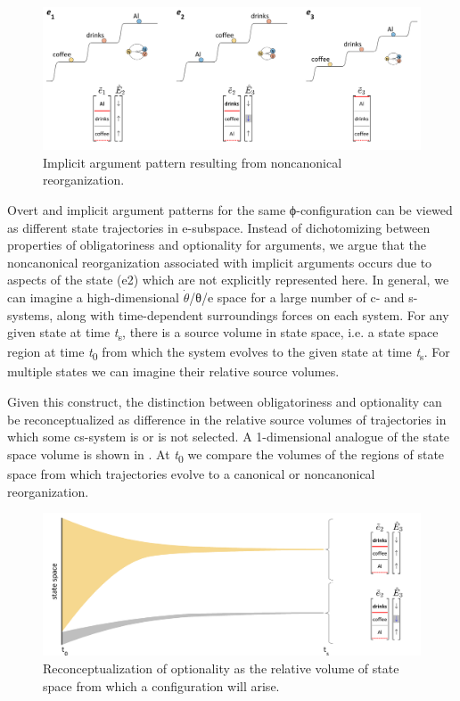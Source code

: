   
\begin{figure}
\includegraphics[width=\textwidth]{figures/Tilsen-img87.png}
\caption{Implicit argument pattern resulting from noncanonical reorganization.}
\label{fig:4:37}
\end{figure}
 

  Overt and implicit argument patterns for the same ϕ-configuration can be viewed as different state trajectories in e-subspace. Instead of dichotomizing between properties of obligatoriness and optionality for arguments, we argue that the noncanonical reorganization associated with implicit arguments occurs due to aspects of the state (e2) which are not explicitly represented here. In general, we can imagine a high-dimensional $\dot{\theta}$/θ/e space for a large number of c- and s-systems, along with time-dependent surroundings forces on each system. For any given state at time \textit{t}\textsubscript{s}, there is a source volume in state space, i.e. a state space region at time \textit{t}\textsubscript{0} from which the system evolves to the given state at time \textit{t}\textsubscript{s}. For multiple states we can imagine their relative source volumes. 

  Given this construct, the distinction between obligatoriness and optionality can be reconceptualized as difference in the relative source volumes of trajectories in which some cs-system is or is not selected. A 1-dimensional analogue of the state space volume is shown in {}. At \textit{t}\textsubscript{0} we compare the volumes of the regions of state space from which trajectories evolve to a canonical or noncanonical reorganization.

  
\begin{figure}
\includegraphics[width=\textwidth]{figures/Tilsen-img88.png}
\caption{Reconceptualization of optionality as the relative volume of state space from which a configuration will arise.}
\label{fig:4:38}
\end{figure}
 

